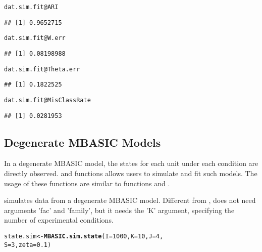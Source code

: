 \documentclass[a4paper,10pt]{article}\usepackage[]{graphicx}\usepackage[]{color}
\makeatletter
\newcommand{\hlnum}[1]{\textcolor[rgb]{0.686,0.059,0.569}{#1}}%
\newcommand{\hlopt}[1]{\textcolor[rgb]{0,0,0}{#1}}%
\newcommand{\hlstd}[1]{\textcolor[rgb]{0.345,0.345,0.345}{#1}}%
\newcommand{\hlkwb}[1]{\textcolor[rgb]{0.69,0.353,0.396}{#1}}%
\newcommand{\hlkwc}[1]{\textcolor[rgb]{0.333,0.667,0.333}{#1}}%
\newcommand{\hlkwd}[1]{\textcolor[rgb]{0.737,0.353,0.396}{\textbf{#1}}}%
\newenvironment{kframe}{%
 \def\at@end@of@kframe{}%
 \ifinner\ifhmode%
  \def\at@end@of@kframe{\end{minipage}}%
  \begin{minipage}{\columnwidth}%
 \fi\fi%
 \def\FrameCommand##1{\hskip\@totalleftmargin \hskip-\fboxsep
 \colorbox{shadecolor}{##1}\hskip-\fboxsep
     \hskip-\linewidth \hskip-\@totalleftmargin \hskip\columnwidth}%
 \MakeFramed {\advance\hsize-\width
   \@totalleftmargin\z@ \linewidth\hsize
   \@setminipage}}%
 {\par\unskip\endMakeFramed%
 \at@end@of@kframe}
\newenvironment{knitrout}{}{} %
\makeatother
\begin{document}
\begin{knitrout}
\color{fgcolor}\begin{kframe}
\begin{alltt}
\hlstd{dat.sim.fit}\hlopt{@}\hlkwc{ARI}
\end{alltt}
\begin{verbatim}
## [1] 0.9652715
\end{verbatim}
\begin{alltt}
\hlstd{dat.sim.fit}\hlopt{@}\hlkwc{W.err}
\end{alltt}
\begin{verbatim}
## [1] 0.08198988
\end{verbatim}
\begin{alltt}
\hlstd{dat.sim.fit}\hlopt{@}\hlkwc{Theta.err}
\end{alltt}
\begin{verbatim}
## [1] 0.1822525
\end{verbatim}
\begin{alltt}
\hlstd{dat.sim.fit}\hlopt{@}\hlkwc{MisClassRate}
\end{alltt}
\begin{verbatim}
## [1] 0.0281953
\end{verbatim}
\end{kframe}
\end{knitrout}

\subsection{Degenerate MBASIC Models}

In a degenerate MBASIC model, the states for each unit under each condition are directly observed.  and  functions allows users to simulate and fit such models. The usage of these functions are similar to functions  and .

 simulates data from a degenerate MBASIC model. Different from ,  does not need arguments 'fac' and 'family', but it needs the 'K' argument, specifying the number of experimental conditions.

\begin{knitrout}
\color{fgcolor}\begin{kframe}
\begin{alltt}
\hlstd{state.sim} \hlkwb{<-} \hlkwd{MBASIC.sim.state}\hlstd{(}\hlkwc{I} \hlstd{=} \hlnum{1000}\hlstd{,} \hlkwc{K} \hlstd{=} \hlnum{10}\hlstd{,} \hlkwc{J} \hlstd{=} \hlnum{4}\hlstd{,}
    \hlkwc{S} \hlstd{=} \hlnum{3}\hlstd{,} \hlkwc{zeta} \hlstd{=} \hlnum{0.1}\hlstd{)}
\end{alltt}
\end{kframe}
\end{knitrout}
\end{document}
